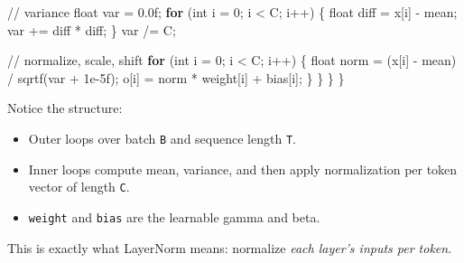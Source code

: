 \documentclass[
  letterpaper,
  DIV=11,
  numbers=noendperiod]{scrreprt}
\newenvironment{Shaded}{\begin{snugshade}}{\end{snugshade}}
\newcommand{\BuiltInTok}[1]{\textcolor[rgb]{0.00,0.23,0.31}{#1}}
\newcommand{\CommentTok}[1]{\textcolor[rgb]{0.37,0.37,0.37}{#1}}
\newcommand{\ControlFlowTok}[1]{\textcolor[rgb]{0.00,0.23,0.31}{\textbf{#1}}}
\newcommand{\DataTypeTok}[1]{\textcolor[rgb]{0.68,0.00,0.00}{#1}}
\newcommand{\DecValTok}[1]{\textcolor[rgb]{0.68,0.00,0.00}{#1}}
\newcommand{\FloatTok}[1]{\textcolor[rgb]{0.68,0.00,0.00}{#1}}
\newcommand{\NormalTok}[1]{\textcolor[rgb]{0.00,0.23,0.31}{#1}}
\newcommand{\OperatorTok}[1]{\textcolor[rgb]{0.37,0.37,0.37}{#1}}
\providecommand{\tightlist}{%
  \setlength{\itemsep}{0pt}\setlength{\parskip}{0pt}}
\begin{document}
\begin{Shaded}
\begin{Highlighting}[]
            \CommentTok{// variance}
            \DataTypeTok{float}\NormalTok{ var }\OperatorTok{=} \FloatTok{0.0}\BuiltInTok{f}\OperatorTok{;}
            \ControlFlowTok{for} \OperatorTok{(}\DataTypeTok{int}\NormalTok{ i }\OperatorTok{=} \DecValTok{0}\OperatorTok{;}\NormalTok{ i }\OperatorTok{\textless{}}\NormalTok{ C}\OperatorTok{;}\NormalTok{ i}\OperatorTok{++)} \OperatorTok{\{}
                \DataTypeTok{float}\NormalTok{ diff }\OperatorTok{=}\NormalTok{ x}\OperatorTok{[}\NormalTok{i}\OperatorTok{]} \OperatorTok{{-}}\NormalTok{ mean}\OperatorTok{;}
\NormalTok{                var }\OperatorTok{+=}\NormalTok{ diff }\OperatorTok{*}\NormalTok{ diff}\OperatorTok{;}
            \OperatorTok{\}}
\NormalTok{            var }\OperatorTok{/=}\NormalTok{ C}\OperatorTok{;}

            \CommentTok{// normalize, scale, shift}
            \ControlFlowTok{for} \OperatorTok{(}\DataTypeTok{int}\NormalTok{ i }\OperatorTok{=} \DecValTok{0}\OperatorTok{;}\NormalTok{ i }\OperatorTok{\textless{}}\NormalTok{ C}\OperatorTok{;}\NormalTok{ i}\OperatorTok{++)} \OperatorTok{\{}
                \DataTypeTok{float}\NormalTok{ norm }\OperatorTok{=} \OperatorTok{(}\NormalTok{x}\OperatorTok{[}\NormalTok{i}\OperatorTok{]} \OperatorTok{{-}}\NormalTok{ mean}\OperatorTok{)} \OperatorTok{/}\NormalTok{ sqrtf}\OperatorTok{(}\NormalTok{var }\OperatorTok{+} \FloatTok{1e{-}5}\BuiltInTok{f}\OperatorTok{);}
\NormalTok{                o}\OperatorTok{[}\NormalTok{i}\OperatorTok{]} \OperatorTok{=}\NormalTok{ norm }\OperatorTok{*}\NormalTok{ weight}\OperatorTok{[}\NormalTok{i}\OperatorTok{]} \OperatorTok{+}\NormalTok{ bias}\OperatorTok{[}\NormalTok{i}\OperatorTok{];}
            \OperatorTok{\}}
        \OperatorTok{\}}
    \OperatorTok{\}}
\OperatorTok{\}}
\end{Highlighting}
\end{Shaded}

Notice the structure:

\begin{itemize}
\tightlist
\item
  Outer loops over batch \texttt{B} and sequence length \texttt{T}.
\item
  Inner loops compute mean, variance, and then apply normalization per
  token vector of length \texttt{C}.
\item
  \texttt{weight} and \texttt{bias} are the learnable gamma and beta.
\end{itemize}

This is exactly what LayerNorm means: normalize \emph{each layer's
inputs per token}.
\end{document}
